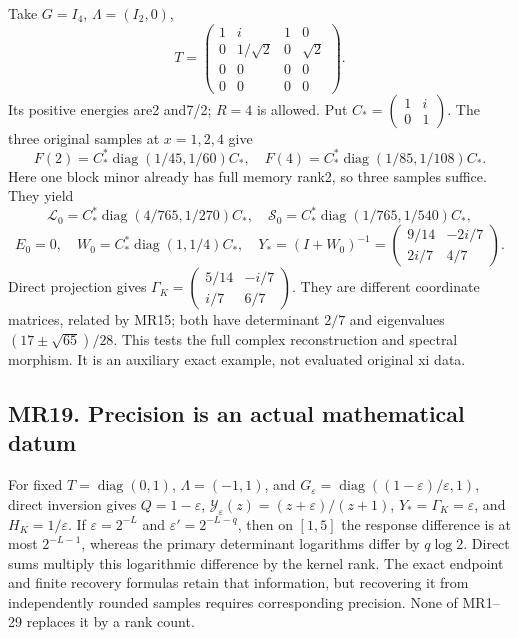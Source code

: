 \documentclass[11pt]{article}
\begin{document}
Take \(G=I_4\), \(\Lambda=(I_2,0)\), \[
 T=\begin{pmatrix}1&i&1&0\\0&1/\sqrt2&0&\sqrt2\\0&0&0&0\\0&0&0&0\end{pmatrix}.
\] Its positive energies are2 and7/2; \(R=4\) is allowed. Put \(C_*=\left(\begin{smallmatrix}1&i\\0&1\end{smallmatrix}\right)\). The three original samples at \(x=1,2,4\) give \[
 F(2)=C_*^*\operatorname{diag}(1/45,1/60)C_*,
 \quad F(4)=C_*^*\operatorname{diag}(1/85,1/108)C_*.
\] Here one block minor already has full memory rank2, so three samples suffice. They yield \[
 \mathcal L_0=C_*^*\operatorname{diag}(4/765,1/270)C_*,
 \quad\mathcal S_0=C_*^*\operatorname{diag}(1/765,1/540)C_*,
\] \[
 E_0=0,\quad W_0=C_*^*\operatorname{diag}(1,1/4)C_*,
 \quad Y_*=(I+W_0)^{-1}
 =\begin{pmatrix}9/14&-2i/7\\2i/7&4/7\end{pmatrix}.
\] Direct projection gives \(\Gamma_K=\left(\begin{smallmatrix}5/14&-i/7\\i/7&6/7\end{smallmatrix}\right)\). They are different coordinate matrices, related by MR15; both have determinant \(2/7\) and eigenvalues \((17\pm\sqrt{65})/28\). This tests the full complex reconstruction and spectral morphism. It is an auxiliary exact example, not evaluated original xi data.

\subsection{MR19. Precision is an actual mathematical datum}\label{mr19.-precision-is-an-actual-mathematical-datum}

For fixed \(T=\operatorname{diag}(0,1)\), \(\Lambda=(-1,1)\), and \(G_\varepsilon=\operatorname{diag}((1-\varepsilon)/\varepsilon,1)\), direct inversion gives \(Q=1-\varepsilon\), \(\mathscr Y_\varepsilon(z)=(z+\varepsilon)/(z+1)\), \(Y_*=\Gamma_K=\varepsilon\), and \(H_K=1/\varepsilon\). If \(\varepsilon=2^{-L}\) and \(\varepsilon'=2^{-L-q}\), then on \([1,5]\) the response difference is at most \(2^{-L-1}\), whereas the primary determinant logarithms differ by \(q\log2\). Direct sums multiply this logarithmic difference by the kernel rank. The exact endpoint and finite recovery formulas retain that information, but recovering it from independently rounded samples requires corresponding precision. None of MR1--29 replaces it by a rank count.
\end{document}

